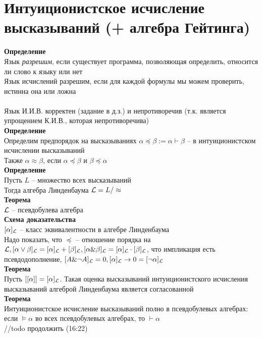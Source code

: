 \documentclass[12pt]{article}
\begin{document}
\section{Интуиционистское исчисление высказываний (+ алгебра Гейтинга)}
\textbf{Определение}\\
Язык \textit{разрешим}, если существует программа, позволяющая определить, относится ли слово к языку или нет\\
Язык исчислений разрешим, если для каждой формулы мы можем проверить, истинна она или ложна\\\\
Язык И.И.В. корректен (задание в д.з.) и непротиворечив (т.к. является упрощением К.И.В., которая непротиворечива)\\
\textbf{Определение}\\
Определим предпорядок на высказываниях $\alpha \preceq \beta := \alpha \vdash \beta$ -- в интуиционистском исчислении высказываний\\
Также $\alpha \approx \beta$, если $\alpha \preceq \beta$ и $\beta \preceq \alpha$\\
\textbf{Определение}\\
Пусть $L$ -- множество всех высказываний\\
Тогда алгебра Линденбаума $\mathcal L = L / \approx$\\
\textbf{Теорема}\\
$\mathcal L$ -- псевдобулева алгебра\\
\textbf{Схема доказательства}\\
$[\alpha]_{\mathcal L}$ -- класс эквивалентности в алгебре Линденбаума\\
Надо показать, что $\preceq$ -- отношение порядка на $\mathcal L, [\alpha \lor \beta]_{\mathcal L} = [\alpha]_{\mathcal L} + [\beta]_{\mathcal L}, [\alpha \& \beta]_{\mathcal L} = [\alpha]_{\mathcal L} \cdot [\beta]_{\mathcal L}$, что импликация есть псевдодополнение, $[A \& \lnot A]_{\mathcal L} = 0, [\alpha]_{\mathcal L} \rightarrow 0 = [\lnot \alpha]_{\mathcal L}$\\
\textbf{Теорема}\\
Пусть $[[\alpha]] = [\alpha]_{\mathcal L}$. Такая оценка высказываний интуиционистского исчисления высказываний алгеброй Линденбаума является согласованной\\
\textbf{Теорема}\\
Интуиционистское исчисление высказываний полно в псевдобулевых алгебрах: если $\models \alpha$ во всех псевдобулевых алгебрах, то $\vdash \alpha$\\
//todo продолжить (16:22)
\end{document}
